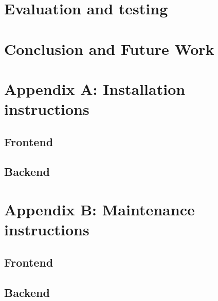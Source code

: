 \documentclass[11pt]{report}
\begin{document}









\chapter{Evaluation and testing}



\chapter{Conclusion and Future Work}


\chapter{Appendix A: Installation instructions}
\section {Frontend}

\section {Backend}

\chapter {Appendix B: Maintenance instructions}

\section{Frontend}

\section{Backend}

\end{document}
